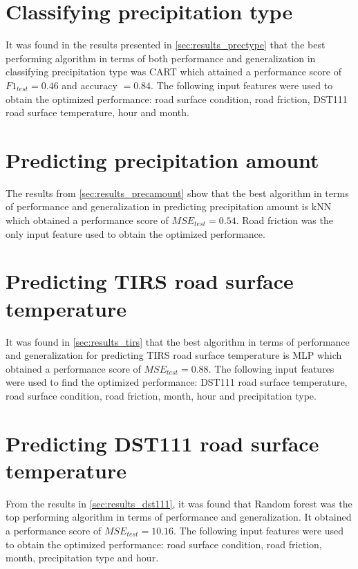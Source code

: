 	\section{Classifying precipitation type}
	It was found in the results presented in \ref{sec:results_prectype} that the best performing algorithm in terms of both performance and generalization in classifying precipitation type was CART which attained a performance score of $F1_{test}=0.46$ and accuracy $=0.84$. The following input features were used to obtain the optimized performance:  road surface condition, road friction, DST111 road surface temperature, hour and month.

	\section{Predicting precipitation amount}
	The results from \ref{sec:results_precamount} show that the best algorithm in terms of performance and generalization in predicting precipitation amount is kNN which obtained a performance score of $MSE_{test} = 0.54$. Road friction was the only input feature used to obtain the optimized performance.

	\section{Predicting TIRS road surface temperature}
	It was found in \ref{sec:results_tirs} that the best algorithm in terms of performance and generalization for predicting TIRS road surface temperature is MLP which obtained a performance score of $MSE_{test} = 0.88$. The following input features were used to find the optimized performance: DST111 road surface temperature, road surface condition, road friction, month, hour and precipitation type.

	\section{Predicting DST111 road surface temperature}

	From the results in \ref{sec:results_dst111}, it was found that Random forest was the top performing algorithm in terms of performance and generalization. It obtained a performance score of $MSE_{test} = 10.16$. The following input features were used to obtain the optimized performance: road surface condition, road friction, month, precipitation type and hour. 
	
